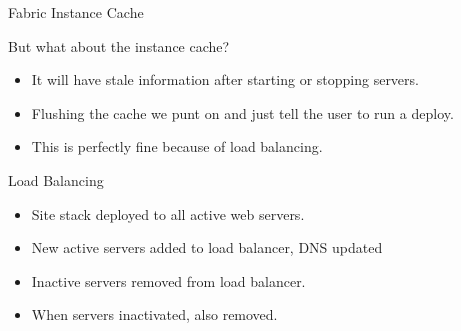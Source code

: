 \documentclass{beamer}
\begin{document}
\begin{frame}{Fabric Instance Cache}

But what about the instance cache?

\begin{itemize}
\item It will have stale information after starting or stopping servers.
\item Flushing the cache we punt on and just tell the user to run a
  deploy.
\item This is perfectly fine because of load balancing.
\end{itemize}
\end{frame}

\begin{frame}{Load Balancing}

\begin{itemize}
\item Site stack deployed to all active web servers.
\item New active servers added to load balancer, DNS updated
\item Inactive servers removed from load balancer.
\item When servers inactivated, also removed.
\end{itemize}
\end{frame}
\end{document}

